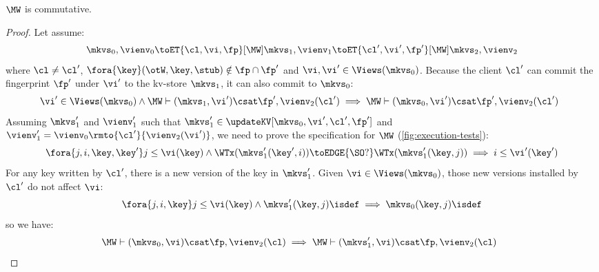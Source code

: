 \begin{lemma}
    \label{lem:mw-comm}
    \(\MW\) is commutative.
\end{lemma}
\begin{proof}
    Let assume:
    \[
        \mkvs_0, \vienv_0 \toET{\cl, \vi, \fp}[\MW] \mkvs_1, \vienv_1 \toET{\cl', \vi', \fp'}[\MW] \mkvs_2, \vienv_2 
    \]
    where \( \cl \neq \cl' \), \( \fora{ \key } (\otW, \key, \stub) \notin \fp \cap \fp' \) and \( \vi, \vi' \in \Views(\mkvs_0)\).
    Because the client \( \cl' \) can commit the fingerprint \( \fp' \) under \( \vi' \) to the kv-store \( \mkvs_1 \), it can also commit to \( \mkvs_0 \):
    \[
        \begin{array}{@{}l}
            \vi' \in \Views(\mkvs_0) \land \MW \vdash (\mkvs_1, \vi') \csat \fp', \vienv_2(\cl') \implies  \MW \vdash (\mkvs_0, \vi') \csat \fp', \vienv_2(\cl')
        \end{array}
    \]
    Assuming \( \mkvs'_1 \) and \( \vienv'_1 \) such that \( \mkvs'_1 \in \updateKV[\mkvs_0,\vi',\cl',\fp'] \) and \( \vienv'_1 = \vienv_0\rmto{\cl'}{\vienv_2(\vi')} \), we need to prove the specification for \( \MW \) (\cref{fig:execution-tests}):
    \[
        \fora{j,i, \key, \key'} j \leq \vi(\key) \wedge \WTx(\mkvs'_1(\key', i)) \toEDGE{\SO ?} \WTx(\mkvs'_1(\key, j)) \implies i \leq \vi'(\key')  \\
    \]
    For any key written by \( \cl' \), there is a new version of the key in \( \mkvs'_1 \).
    Given \( \vi \in \Views(\mkvs_0)\), those new versions installed by \( \cl' \) do not affect \( \vi \):
    \[
        \fora{j,i, \key} j \leq \vi(\key) \land \mkvs'_1(\key, j)\isdef \implies \mkvs_0(\key, j)\isdef
    \]
    so we have:
    \[
        \begin{array}{@{}l}
            \MW \vdash (\mkvs_0, \vi) \csat \fp, \vienv_2(\cl) \implies  \MW \vdash (\mkvs'_1, \vi) \csat \fp, \vienv_2(\cl)
        \end{array}
    \]
\end{proof}



